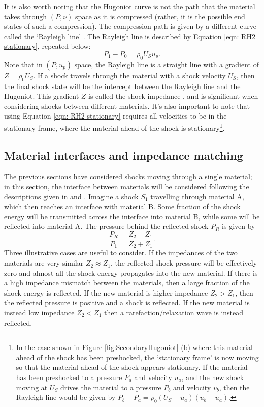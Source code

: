 It is also worth noting that the Hugoniot curve is not the path that the material takes through $(P, \nu)$ space as it is compressed (rather, it is the possible end states of such a compression). The compression path is given by a different curve called the `Rayleigh line' \cite{Forbes2012}. The Rayleigh line is described by Equation \ref{eqn: RH2 stationary}, repeated below:
\begin{equation} P_1 - P_0 = \rho_0 U_S u_p.  \end{equation}
Note that in $(P, u_p)$ space, the Rayleigh line is a straight line with a gradient of $Z = \rho_0 U_S$. If a shock travels through the material with a shock velocity $U_S$, then the final shock state will be the intercept between the Rayleigh line and the Hugoniot. This gradient $Z$ is called the shock impedance , and is significant when considering shocks between different materials. It's also important to note that using Equation \ref{eqn: RH2 stationary} requires all velocities to be in the stationary frame, where the material ahead of the shock is stationary\footnote{In the case shown in Figure \ref{fig:SecondaryHugoniot} (b) where this material ahead of the shock has been preshocked, the `stationary frame' is now moving so that the material ahead of the shock appears stationary. If the material has been preshocked to a pressure $P_a$ and velocity $u_a$, and the new shock moving at $U_S$ drives the material to a pressure $P_b$ and velocity $v_b$, then the Rayleigh line would be given by $P_b - P_a = \rho_0 (U_S - u_a) (u_b - u_a).$ }.

\subsection{Material interfaces and impedance matching \label{IMTheory}}

The previous sections have considered shocks moving through a single material; in this section, the interface between materials will be considered following the descriptions given in \cite{Forbes2012} and \cite{Davison2008}. Imagine a shock $S_1$ travelling through material A, which then reaches an interface with material B. Some fraction of the shock energy will be transmitted across the interface into material B, while some will be reflected into material A. The pressure behind the reflected shock $P_R$ is given \cite{Colvin2013} by 
\begin{equation} \frac{P_R}{P_1} = \frac{Z_2 - Z_1}{Z_2 + Z_1}.  \end{equation}
Three illustrative cases are useful to consider. If the impedances of the two materials are very similar $Z_2 \approx Z_1$, the reflected shock pressure will be effectively zero and almost all the shock energy propagates into the new material. If there is a high impedance mismatch between the materials, then a large fraction of the shock energy is reflected. If the new material is higher impedance $Z_2 > Z_1$, then the reflected pressure is positive and a shock is reflected. If the new material is instead low impedance $Z_2 < Z_1$ then a rarefaction/relaxation wave is instead reflected.

